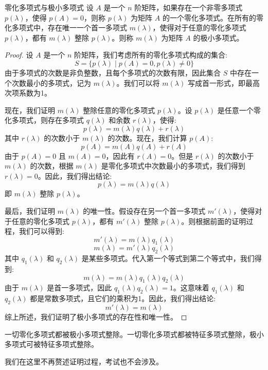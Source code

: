 \documentclass[a4paper,12pt]{ctexart}
\begin{document}
\begin{mythm}{零化多项式与极小多项式}{}
    设 $A$ 是一个 $n$ 阶矩阵，如果存在一个非零多项式 $p(\lambda)$，使得 $p(A) = 0$，则称 $p(\lambda)$ 为矩阵 $A$ 的一个零化多项式。在所有的零化多项式中，存在唯一一个首一多项式 $m(\lambda)$，使得对于任意的零化多项式 $p(\lambda)$，都有 $m(\lambda)$ 整除 $p(\lambda)$。则称 $m(\lambda)$ 为矩阵 $A$ 的极小多项式。
\end{mythm}
\begin{proof}
    设 $A$ 是一个 $n$ 阶矩阵，我们考虑所有的零化多项式构成的集合:
    \[
    S = \{ p(\lambda) \mid p(A) = 0, p(\lambda) \neq 0 \}
    \]
    由于多项式的次数是非负整数，且每个多项式的次数有限，因此集合 $S$ 中存在一个次数最小的多项式，记为 $m(\lambda)$。我们可以将 $m(\lambda)$ 写成首一形式，即最高次项系数为1。

    现在，我们证明 $m(\lambda)$ 整除任意的零化多项式 $p(\lambda)$。设 $p(\lambda)$ 是任意一个零化多项式，则存在多项式 $q(\lambda)$ 和余数 $r(\lambda)$，使得:
    \[
    p(\lambda) = m(\lambda) q(\lambda) + r(\lambda)
    \]
    其中 $r(\lambda)$ 的次数小于 $m(\lambda)$ 的次数。现在，我们计算 $p(A)$:
    \[
    p(A) = m(A) q(A) + r(A)
    \]
    由于 $p(A) = 0$ 且 $m(A) = 0$，因此有 $r(A) = 0$。但是 $r(\lambda)$ 的次数小于 $m(\lambda)$ 的次数，根据 $m(\lambda)$ 是零化多项式中次数最小的多项式，我们得到 $r(\lambda) = 0$。因此，我们得出结论:
    \[
    p(\lambda) = m(\lambda) q(\lambda)
    \]
    即 $m(\lambda)$ 整除 $p(\lambda)$。

    最后，我们证明 $m(\lambda)$ 的唯一性。假设存在另一个首一多项式 $m'(\lambda)$，使得对于任意的零化多项式 $p(\lambda)$，都有 $m'(\lambda)$ 整除 $p(\lambda)$。则根据前面的证明过程，我们可以得到:
    \[
    m'(\lambda) = m(\lambda) q_1(\lambda)
    \]
    \[
    m(\lambda) = m'(\lambda) q_2(\lambda)
    \]
    其中 $q_1(\lambda)$ 和 $q_2(\lambda)$ 是某些多项式。代入第一个等式到第二个等式中，我们得到:
    \[
    m(\lambda) = m(\lambda) q_1(\lambda) q_2(\lambda)
    \]
    由于 $m(\lambda)$ 是首一多项式，因此 $q_1(\lambda) q_2(\lambda) = 1$。这意味着 $q_1(\lambda)$ 和 $q_2(\lambda)$ 都是常数多项式，且它们的乘积为1。因此，我们得出结论:
    \[
    m'(\lambda) = m(\lambda)
    \]
    综上所述，我们证明了极小多项式的存在性和唯一性。
\end{proof}

\begin{mythm}{}{}
    一切零化多项式都被极小多项式整除。一切零化多项式都被特征多项式整除，极小多项式可被特征多项式整除。
\end{mythm}
我们在这里不再赘述证明过程，考试也不会涉及。
\end{document}
